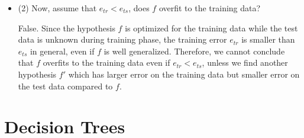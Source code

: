 \begin{enumerate}
\begin{itemize}
\item (2) Now, assume that $e_{tr} < e_{ts}$, does $f$ overfit to the training data?

False. Since the hypothesis $f$ is optimized for the training data while the test data is unknown during training phase, the training error $e_{tr}$ is smaller than $e_{ts}$ in general, even if $f$ is well generalized. Therefore, we cannot conclude that $f$ overfits to the training data even if $e_{tr} < e_{ts}$, unless we find another hypothesis $f'$ which has larger error on the training data but smaller error on the test data compared to $f$.

\end{itemize}

\end{enumerate}

\section{Decision Trees}

